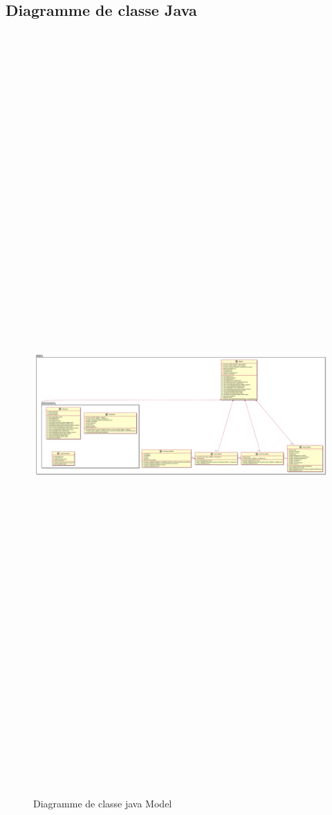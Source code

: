 \documentclass[11pt,a4paper]{report} %
\begin{document}
		\begin{landscape}
		\section{Diagramme de classe Java}

		
		\begin{figure}[H]
			\centering
			\includegraphics[width = 25cm ,height = 35cm,keepaspectratio]{./Picture/Diagramme de class java Model.png}
			\caption{Diagramme de classe java Model} 
			\label{diagClass}
		\end{figure}
		\newpage
		

\end{landscape}
\end{document}
